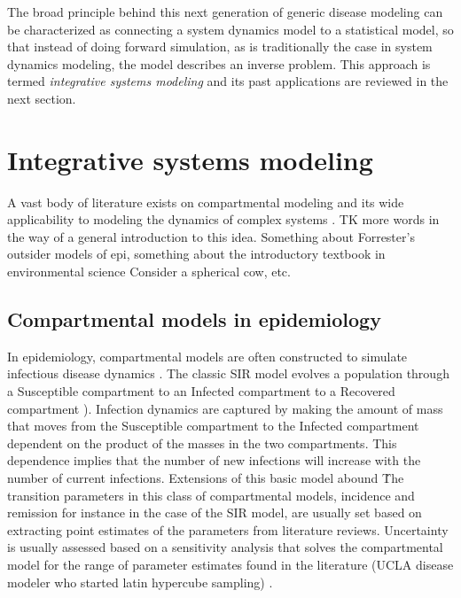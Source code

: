 The broad principle behind this next generation of generic disease
modeling can be characterized as connecting a system dynamics model to
a statistical model, so that instead of doing forward simulation, as
is traditionally the case in system dynamics modeling, the model
describes an inverse problem. This approach is termed
\emph{integrative systems modeling} and its past applications are
reviewed in the next section.

\section{Integrative systems modeling}
A vast body of literature exists on compartmental modeling and its
wide applicability to modeling the dynamics of complex systems
\cite{Forrester_Principles_1968, Meadows_Thinking_2008,
  Bossel_Systems_2007}.  TK more words in the way of a general
introduction to this idea.  Something about Forrester's outsider
models of epi, something about the introductory textbook in
environmental science Consider a spherical cow, etc.

\subsection{Compartmental models in epidemiology}
In epidemiology, compartmental models are often constructed to
simulate infectious disease dynamics
\cite{Anderson_Infectious_1991}. The classic SIR model evolves a
population through a Susceptible compartment to an Infected
compartment to a Recovered compartment
\cite{Kermack_Contribution_1927}). Infection dynamics are captured by
making the amount of mass that moves from the Susceptible compartment
to the Infected compartment dependent on the product of the masses in
the two compartments. This dependence implies that the number of new
infections will increase with the number of current
infections. Extensions of this basic model abound
\cite{Daley_Epidemic_2001,Brauer_Mathematical_2001}\. The transition
parameters in this class of compartmental models, incidence and
remission for instance in the case of the SIR model, are usually set
based on extracting point estimates of the parameters from literature
reviews. Uncertainty is usually assessed based on a sensitivity
analysis that solves the compartmental model for the range of
parameter estimates found in the literature (UCLA disease modeler who
started latin hypercube sampling) \cite{Nagelkerke_Modelling_2002,
  Brandeau_Screening_1993, Broutin_Impact_2010}.

